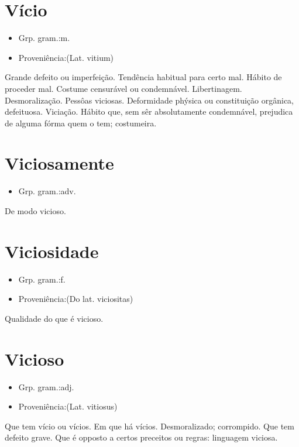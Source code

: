 \documentclass{article}
\begin{document}
\section{Vício}
\begin{itemize}
\item {Grp. gram.:m.}
\end{itemize}
\begin{itemize}
\item {Proveniência:(Lat. \textunderscore vitium\textunderscore )}
\end{itemize}
Grande defeito ou imperfeição.
Tendência habitual para certo mal.
Hábito de proceder mal.
Costume censurável ou condemnável.
Libertinagem.
Desmoralização.
Pessôas viciosas.
Deformidade phýsica ou constituição orgânica, defeituosa.
Viciação.
Hábito que, sem sêr absolutamente condemnável, prejudica de alguma fórma quem o tem; costumeira.
\section{Viciosamente}
\begin{itemize}
\item {Grp. gram.:adv.}
\end{itemize}
De modo vicioso.
\section{Viciosidade}
\begin{itemize}
\item {Grp. gram.:f.}
\end{itemize}
\begin{itemize}
\item {Proveniência:(Do lat. \textunderscore viciositas\textunderscore )}
\end{itemize}
Qualidade do que é vicioso.
\section{Vicioso}
\begin{itemize}
\item {Grp. gram.:adj.}
\end{itemize}
\begin{itemize}
\item {Proveniência:(Lat. \textunderscore vitiosus\textunderscore )}
\end{itemize}
Que tem vício ou vícios.
Em que há vícios.
Desmoralizado; corrompido.
Que tem defeito grave.
Que é opposto a certos preceitos ou regras: \textunderscore linguagem viciosa\textunderscore .
\end{document}
